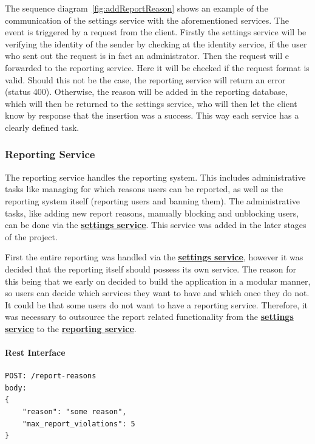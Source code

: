 The sequence diagram~\ref{fig:addReportReason} shows an example of the communication of the settings service with the
aforementioned services.
The event is triggered by a request from the client.
Firstly the settings service will be verifying the identity of the sender by checking at the identity service, if the
user who sent out the request is in fact an administrator.
Then the request will e forwarded to the reporting service.
Here it will be checked if the request format is valid.
Should this not be the case, the reporting service will return an error (status 400).
Otherwise, the reason will be added in the reporting database, which will then be returned to the settings service,
who will then let the client know by response that the insertion was a success.
This way each service has a clearly defined task.

\subsubsection{Reporting Service}\label{subsubsec:reportingSer}

The reporting service handles the reporting system.
This includes administrative tasks like managing for which reasons users can be reported, as well as the reporting
system itself (reporting users and banning them).
The administrative tasks, like adding new report reasons, manually blocking and unblocking users, can be done via the
\hyperref[subsubsec:settingsSer]{\textbf{settings service}}.
This service was added in the later stages of the project.

First the entire reporting was handled via the \hyperref[subsubsec:settingsSer]{\textbf{settings service}}, however it
was decided that the reporting itself should possess its own service. The reason for this being that we early on decided
to build the application in a modular manner, so users can decide which services they want to have and which once they do not.
It could be that some users do not want to have a reporting service.
Therefore, it was necessary to outsource the report related functionality from the
\hyperref[subsubsec:settingsSer]{\textbf{settings service}} to the
\hyperref[subsubsec:reportingSer]{\textbf{reporting service}}.

\paragraph{Rest Interface}
\begin{lstlisting}[label={lst:lstlisting7}]
POST: /report-reasons
body:
{
    "reason": "some reason",
    "max_report_violations": 5
}
\end{lstlisting}

